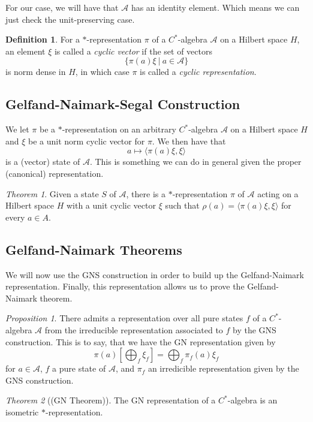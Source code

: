 \documentclass[leqno]{article}
\theoremstyle{definition}
\newtheorem{definition}{Definition}[section]
\theoremstyle{remark}
\theoremstyle{theorem}
\newtheorem{theorem}{Theorem}[section]
\newtheorem{proposition}{Proposition}
\newcommand{\A}{\mathcal{A}}
\begin{document}
\noindent For our case, we will have that $\A$ has an identity element.  Which means we can just check the unit-preserving case.

\begin{definition}
For a $*$-representation $\pi$ of a $C^*$-algebra $\A$ on a Hilbert space $H$, an element $\xi$ is called a \emph{cyclic vector} if the set of vectors
\[
\{\pi(a)\xi ~\vert~ a\in \A\}
\]
is norm dense in $H$, in which case $\pi$ is called a \emph{cyclic representation}.
\end{definition}

\subsection{Gelfand-Naimark-Segal Construction}

We let $\pi$ be a $*$-representation on an arbitrary $C^*$-algebra $\A$ on a Hilbert space $H$ and $\xi$ be a unit norm cyclic vector for $\pi$.  We then have that 
\[
a \mapsto \langle \pi(a)\xi,\xi \rangle
\]
is a (vector) state of $\A$. This is something we can do in general given the proper (canonical) representation.

\begin{theorem}
Given a state $S$ of $\A$, there is a $*$-representation $\pi$ of $\A$ acting on a Hilbert space $H$ with a unit cyclic vector $\xi$ such that $\rho(a)=\langle \pi(a)\xi,\xi\rangle$ for every $a \in A$.
\end{theorem}

\subsection{Gelfand-Naimark Theorems}

We will now use the GNS construction in order to build up the Gelfand-Naimark representation.  Finally, this representation allows us to prove the Gelfand-Naimark theorem. 

\begin{proposition}
There admits a representation over all pure states $f$ of a $C^*$-algebra $\A$ from the irreducible representation associated to $f$ by the GNS construction. This is to say, that we have the GN representation given by
\[
\pi(a)\left[ \bigoplus_{f} \xi_f \right] = \bigoplus_{f}\pi_f(a)\xi_f
\]
for $a\in \A$, $f$ a pure state of $\A$, and $\pi_f$ an irredicible representation given by the GNS construction.
\end{proposition}

\begin{theorem}[(GN Theorem)]
The GN representation of a $C^*$-algebra is an isometric $*$-representation.  
\end{theorem}
\end{document}
